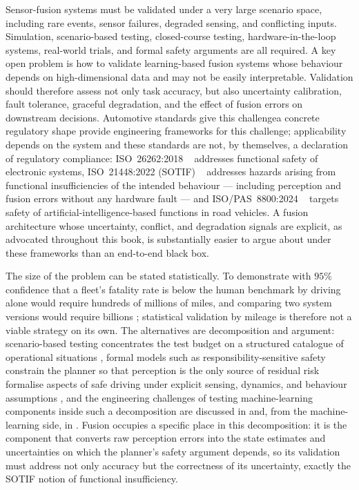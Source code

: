 \documentclass[graybox,envcountchap]{style/SNmono}
\providecommand{\DIFadd}[1]{{\protect\color{blue} #1}} %
\providecommand{\DIFdel}[1]{{\protect\color{red} #1}} %
\providecommand{\DIFaddbegin}{} %
\providecommand{\DIFaddend}{} %
\providecommand{\DIFdelbegin}{} %
\providecommand{\DIFdelend}{} %
\begin{document}
Sensor-fusion systems must be validated under a very large scenario space, including rare events, sensor failures, degraded sensing, and conflicting inputs. Simulation, scenario-based testing, closed-course testing, hardware-in-the-loop systems, real-world trials, and formal safety arguments are all required. A key open problem is how to validate learning-based fusion systems whose behaviour depends on high-dimensional data and may not be easily interpretable. Validation should therefore assess not only task accuracy, but also uncertainty calibration, fault tolerance, graceful degradation, and the effect of fusion errors on downstream decisions. Automotive standards \DIFdelbegin \DIFdel{give this challengea concrete regulatory shape}\DIFdelend \DIFaddbegin \DIFadd{provide engineering frameworks for this challenge; applicability depends on the system and these standards are not, by themselves, a declaration of regulatory compliance}\DIFaddend : ISO~26262:2018\DIFaddbegin \DIFadd{~}\cite{iso26262_2018} \DIFaddend addresses functional safety of electronic systems, ISO~21448:2022 (SOTIF)\DIFaddbegin \DIFadd{~}\cite{iso21448_2022} \DIFaddend addresses hazards arising from functional insufficiencies of the intended behaviour --- including perception and fusion errors without any hardware fault --- and ISO/PAS~8800:2024\DIFaddbegin \DIFadd{~}\cite{iso8800_2024} \DIFaddend targets safety of artificial-intelligence-based functions in road vehicles. A fusion architecture whose uncertainty, conflict, and degradation signals are explicit, as advocated throughout this book, is substantially easier to argue about under these frameworks than an end-to-end black box. 

The size of the problem can be stated statistically. To demonstrate with $95\%$ confidence that a fleet's fatality rate is below the human benchmark by driving alone would require hundreds of millions of miles, and comparing two system versions would require billions \cite{kalra2016_miles}; statistical validation by mileage is therefore not a viable strategy on its own. The alternatives are decomposition and argument: scenario-based testing concentrates the test budget on a structured catalogue of operational situations \cite{riedmaier2020_scenario}, formal models such as responsibility-sensitive safety \DIFdelbegin \DIFdel{constrain the planner so that perception is the only source of residual risk }\DIFdelend \DIFaddbegin \DIFadd{formalise aspects of safe driving under explicit sensing, dynamics, and behaviour assumptions }\DIFaddend \cite{shalevshwartz2017_rss}, and the engineering challenges of testing machine-learning components inside such a decomposition are discussed in \cite{koopman2016_testing} and, from the machine-learning side, in \cite{amodei2016_concrete}. Fusion occupies a specific place in this decomposition: it is the component that converts raw perception errors into the state estimates and uncertainties on which the planner's safety argument depends, so its validation must address not only accuracy but the correctness of its uncertainty, exactly the SOTIF notion of functional insufficiency.
\end{document}

